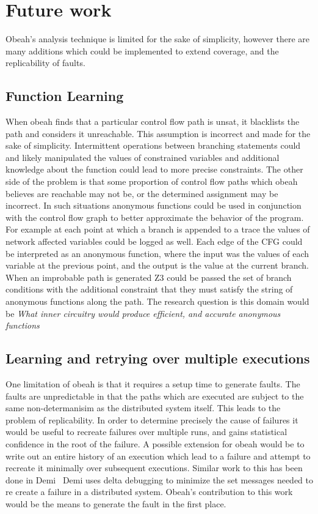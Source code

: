 \section{Future work}
\label{sec:future}

Obeah's analysis technique is limited for the sake of simplicity, however there
are many additions which could be implemented to extend coverage, and the
replicability of faults.

\subsection{Function Learning}

When obeah finds that a particular control flow path is unsat, it blacklists
the path and considers it unreachable. This assumption is incorrect and made
for the sake of simplicity. Intermittent operations between branching statements
could and likely manipulated the values of constrained variables and additional
knowledge about the function could lead to more precise constraints. The other
side of the problem is that some proportion of control flow paths which obeah
believes are reachable may not be, or the determined assignment may be
incorrect. In such situations anonymous functions could be used in conjunction
with the control flow graph to better approximate the behavior of the program.
For example at each point at which a branch is appended to a trace the values
of network affected variables could be logged as well. Each edge of the CFG
could be interpreted as an anonymous function, where the input was the values
of each variable at the previous point, and the output is the value at the
current branch. When an improbable path is generated Z3 could be passed the set
of branch conditions with the additional constraint that they must satisfy the
string of anonymous functions along the path. The research question is this
domain would be \emph{What inner circuitry would produce efficient, and accurate
anonymous functions}

\subsection{Learning and retrying over multiple executions}

One limitation of obeah is that it requires a setup time to generate faults. The
faults are unpredictable in that the paths which are executed are subject to
the same non-determanisim as the distributed system itself. This leads to the
problem of replicability. In order to determine precisely the cause of
failures it would be useful to recreate failures over multiple runs, and gains
statistical confidence in the root of the failure. A possible extension for
obeah would be to write out an entire history of an execution which lead to a
failure and attempt to recreate it minimally over subsequent executions.
Similar work to this has been done in Demi~\cite{} Demi uses delta debugging to
minimize the set messages needed to re create a failure in a distributed
system. Obeah's contribution to this work would be the means to generate the
fault in the first place.

